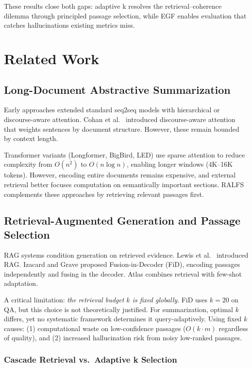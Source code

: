 \documentclass[11pt,a4paper]{article}
\begin{document}
These results close both gaps: adaptive k resolves the retrieval--coherence dilemma through principled passage selection, while EGF enables evaluation that catches hallucinations existing metrics miss.

\section{Related Work}
\label{sec:related}

\subsection{Long-Document Abstractive Summarization}

Early approaches extended standard seq2seq models with hierarchical or discourse-aware attention. Cohan et al.\ \cite{cohan2018discourse} introduced discourse-aware attention that weights sentences by document structure. However, these remain bounded by context length.

Transformer variants (Longformer, BigBird, LED) use sparse attention to reduce complexity from $O(n^2)$ to $O(n \log n)$, enabling longer windows (4K--16K tokens). However, encoding entire documents remains expensive, and external retrieval better focuses computation on semantically important sections. RALFS complements these approaches by retrieving relevant passages first.

\subsection{Retrieval-Augmented Generation and Passage Selection}

RAG systems condition generation on retrieved evidence. Lewis et al.\ \cite{lewis2020rag} introduced RAG. Izacard and Grave \cite{izacard2020leveraging} proposed Fusion-in-Decoder (FiD), encoding passages independently and fusing in the decoder. Atlas \cite{izacard2022few} combines retrieval with few-shot adaptation.

A critical limitation: \emph{the retrieval budget $k$ is fixed globally}. FiD uses $k=20$ on QA, but this choice is not theoretically justified. For summarization, optimal $k$ differs, yet no systematic framework determines it query-adaptively. Using fixed $k$ causes: (1) computational waste on low-confidence passages ($O(k \cdot m)$ regardless of quality), and (2) increased hallucination risk from noisy low-ranked passages.

\subsubsection{Cascade Retrieval vs.\ Adaptive k Selection}
\end{document}
